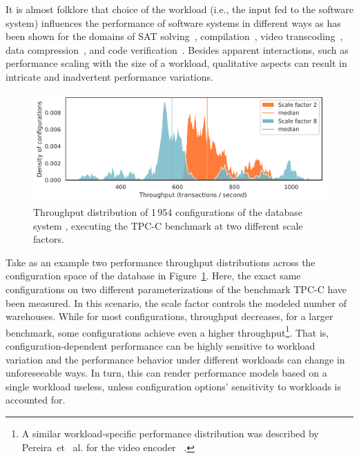 It is almost folklore that choice of the workload (i.e., the input fed to the software system) influences the performance of software systems in different ways as has been shown for the domains of SAT solving~\cite{falkner_sat_solvers_2015,satzilla_2008}, compilation~\cite{ding_compilation_2015,plotnikov_compilation_2013}, video transcoding~\cite{maxiaguine_workload_2004,alves_sampling_2020}, data compression~\cite{khavari_compression_2019}, and code verification~\cite{koc_satune_2021}. Besides apparent interactions, such as performance scaling with the size of a workload, qualitative aspects can result in intricate and inadvertent performance variations.

\begin{figure}
	\centering
	\includegraphics[width=\linewidth]{images/h2_intro.pdf}
	\caption{Throughput distribution of 1\,954 configurations of the database system \htwo, executing the \textsf{TPC-C} benchmark at two different scale factors.}
	\label{fig:h2_intro}
\end{figure}

Take as an example two performance throughput distributions across the configuration space of the database \htwo in Figure~\ref{fig:h2_intro}. Here,  the exact same configurations on two different parameterizations of the benchmark \textsf{TPC-C} have been measured. In this scenario, the scale factor controls the modeled number of warehouses. While for most configurations, throughput decreases, for a larger benchmark, some configurations achieve even a higher throughput\footnote{A similar workload-specific performance distribution was  described by Pereira~et~ al. for the video encoder \xzwo~\cite{alves_sampling_2020}.}. That is, configuration-dependent performance can be highly sensitive to workload variation and the performance behavior under different workloads can change in unforeseeable ways. In turn, this can render performance models based on a single workload useless, unless configuration options’ sensitivity to workloads is accounted for.

